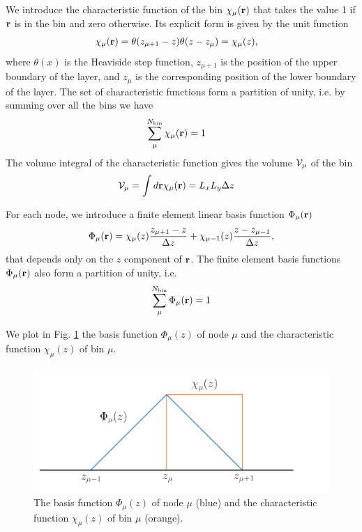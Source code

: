 \documentclass[b5paper,openright,10pt]{book}
\begin{document}
We  introduce the  characteristic function  of the  bin $\chi_\mu({\bf
  r})$ that  takes the value  1 if  ${\bf r}$ is  in the bin  and zero
otherwise.  Its explicit form is given by the unit function
\begin{align}
\chi_\mu({\bf r})&=\theta(z_{\mu+ 1}-z)\theta(z-z_\mu)=\chi_\mu(z),
\label{chi}
\end{align}
where $\theta(x)$ is  the Heaviside step function,  $z_{\mu+1}$ is the
position  of the  upper  boundary of  the layer,  and  $z_\mu$ is  the
corresponding  position  of  the  lower boundary  of  the  layer.   The set of characteristic
functions form  a partition of  unity, i.e.  by summing
over all the bins we have
\begin{align}
  \sum_{\mu}^{N_{\rm bin}}\chi_\mu({\bf r})&=1
\label{PartitionUnity}
\end{align}
The volume  integral of the  characteristic function gives  the volume
${\cal V}_\mu$ of the bin
\begin{align}
{\cal V}_\mu&=  \int d{\bf r}\chi_\mu({\bf r})= L_xL_y\Delta z
\end{align}

For each node, we  introduce  a finite element linear  basis  function
$\Phi_\mu({\bf r})$
\begin{align}
  \Phi_\mu({\bf r})=\chi_\mu(z)\frac{z_{\mu+1}-z}{\Delta z}+\chi_{\mu-1}(z)\frac{z-z_{\mu-1}}{\Delta z},
  \label{basisFunction}
\end{align}
that depends only on the $z$ component of ${\bf r}$. 
The finite element basis functions $\Phi_\mu({\bf r})$ also form a partition of unity, i.e.
\begin{align}
  \sum_\mu^{N_{\rm bin}}\Phi_\mu({\bf r})=1
\label{partition}
\end{align}

We plot  in Fig.  \ref{psichi} the  basis function  $\Phi_\mu(z)$ of
node  $\mu$ and  the  characteristic function  $\chi_\mu(z)$ of  bin
$\mu$.
\begin{figure}[h]
  \centering
  \includegraphics[scale=0.25]{psichi}
  \caption[Basis function $\Phi_\mu(z)$ and the characteristic function $\chi_\mu(z)$]{The basis function $\Phi_\mu(z)$ of node $\mu$ (blue) and the characteristic function $\chi_\mu(z)$ of bin $\mu$ (orange).}
\label{psichi}
\end{figure}
\end{document}
